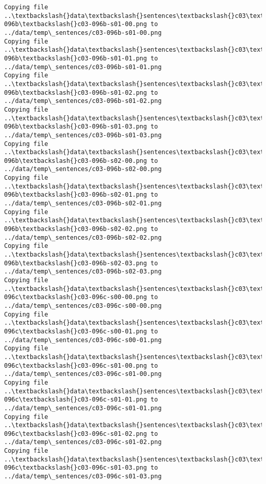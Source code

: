 \documentclass[11pt]{article}
\begin{document}
\begin{Verbatim}[commandchars=\\\{\}]
Copying file ..\textbackslash{}data\textbackslash{}sentences\textbackslash{}c03\textbackslash{}c03-096b\textbackslash{}c03-096b-s01-00.png to
../data/temp\_sentences/c03-096b-s01-00.png
Copying file ..\textbackslash{}data\textbackslash{}sentences\textbackslash{}c03\textbackslash{}c03-096b\textbackslash{}c03-096b-s01-01.png to
../data/temp\_sentences/c03-096b-s01-01.png
Copying file ..\textbackslash{}data\textbackslash{}sentences\textbackslash{}c03\textbackslash{}c03-096b\textbackslash{}c03-096b-s01-02.png to
../data/temp\_sentences/c03-096b-s01-02.png
Copying file ..\textbackslash{}data\textbackslash{}sentences\textbackslash{}c03\textbackslash{}c03-096b\textbackslash{}c03-096b-s01-03.png to
../data/temp\_sentences/c03-096b-s01-03.png
Copying file ..\textbackslash{}data\textbackslash{}sentences\textbackslash{}c03\textbackslash{}c03-096b\textbackslash{}c03-096b-s02-00.png to
../data/temp\_sentences/c03-096b-s02-00.png
Copying file ..\textbackslash{}data\textbackslash{}sentences\textbackslash{}c03\textbackslash{}c03-096b\textbackslash{}c03-096b-s02-01.png to
../data/temp\_sentences/c03-096b-s02-01.png
Copying file ..\textbackslash{}data\textbackslash{}sentences\textbackslash{}c03\textbackslash{}c03-096b\textbackslash{}c03-096b-s02-02.png to
../data/temp\_sentences/c03-096b-s02-02.png
Copying file ..\textbackslash{}data\textbackslash{}sentences\textbackslash{}c03\textbackslash{}c03-096b\textbackslash{}c03-096b-s02-03.png to
../data/temp\_sentences/c03-096b-s02-03.png
Copying file ..\textbackslash{}data\textbackslash{}sentences\textbackslash{}c03\textbackslash{}c03-096c\textbackslash{}c03-096c-s00-00.png to
../data/temp\_sentences/c03-096c-s00-00.png
Copying file ..\textbackslash{}data\textbackslash{}sentences\textbackslash{}c03\textbackslash{}c03-096c\textbackslash{}c03-096c-s00-01.png to
../data/temp\_sentences/c03-096c-s00-01.png
Copying file ..\textbackslash{}data\textbackslash{}sentences\textbackslash{}c03\textbackslash{}c03-096c\textbackslash{}c03-096c-s01-00.png to
../data/temp\_sentences/c03-096c-s01-00.png
Copying file ..\textbackslash{}data\textbackslash{}sentences\textbackslash{}c03\textbackslash{}c03-096c\textbackslash{}c03-096c-s01-01.png to
../data/temp\_sentences/c03-096c-s01-01.png
Copying file ..\textbackslash{}data\textbackslash{}sentences\textbackslash{}c03\textbackslash{}c03-096c\textbackslash{}c03-096c-s01-02.png to
../data/temp\_sentences/c03-096c-s01-02.png
Copying file ..\textbackslash{}data\textbackslash{}sentences\textbackslash{}c03\textbackslash{}c03-096c\textbackslash{}c03-096c-s01-03.png to
../data/temp\_sentences/c03-096c-s01-03.png

\end{Verbatim}
\end{document}
